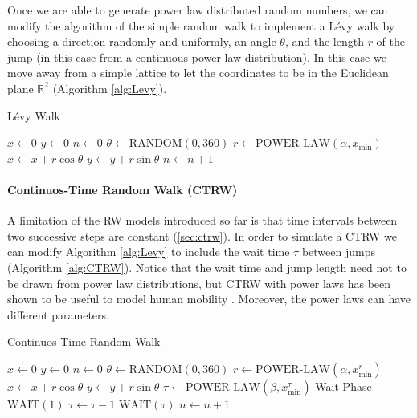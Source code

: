 %
Once we are able to generate power law distributed random numbers, we can modify the algorithm of the simple random walk to implement a L\'evy walk by choosing a direction randomly and uniformly, an angle $\theta$, and the length $r$ of the jump (in this case from a continuous power law distribution). In this case we move away from a simple lattice to let the coordinates to be in the Euclidean plane $\mathbb{R}^2$ (Algorithm \ref{alg:Levy}). 

\begin{algorithm}
\caption{L\'evy Walk}
\label{alg:Levy}
\begin{algorithmic}[1]
\State $x \gets 0$
\State $y \gets 0$
\State $n \gets 0$
		\State $\theta \gets \text{RANDOM}(0,360)$
		\State $r \gets \text{POWER-LAW}(\alpha, x_{\text{min}})$
		\State $x \gets x + r \cos \theta$
		\State $y \gets y + r \sin \theta$
		\State $n \gets n+1$
	\EndWhile
\EndProcedure
\end{algorithmic}
\end{algorithm}

\paragraph{Continuos-Time Random Walk (CTRW)}
A limitation of the RW models introduced so far is that time intervals between two successive steps are constant (\sectionname\ref{sec:ctrw}).
%
In order to simulate a CTRW we can modify Algorithm \ref{alg:Levy} to include the wait time $\tau$ between jumps (Algorithm \ref{alg:CTRW}). Notice that the wait time and jump length need not to be drawn from power law distributions, but CTRW with power laws has been shown to be useful to model human mobility \cite{brockmann_2006_scaling}. Moreover, the power laws can have different parameters.

\begin{algorithm}
\caption{Continuos-Time Random Walk}
\label{alg:CTRW}
\begin{algorithmic}[1]
\State $x \gets 0$
\State $y \gets 0$
\State $n \gets 0$
		\State $\theta \gets \text{RANDOM}(0,360)$
		\State $r \gets \text{POWER-LAW}(\alpha, x^{r}_{\text{min}})$
		\State $x \gets x + r \cos \theta$
		\State $y \gets y + r \sin \theta$
        \State $\tau \gets \text{POWER-LAW}(\beta, x^{\tau}_{\text{min}})$ \Comment Wait Phase
				\State $\text{WAIT}(1)$
				\State $\tau \gets \tau - 1$
			\Else
				\State $\text{WAIT}(\tau)$
			\EndIf
		\EndWhile
		\State $n \gets n+1$
	\EndWhile
\EndProcedure
\end{algorithmic}
\end{algorithm}

